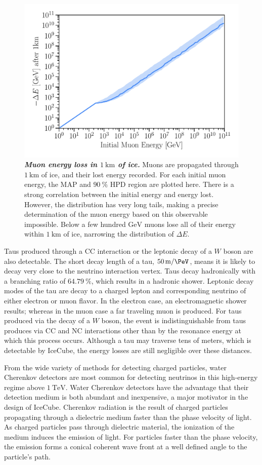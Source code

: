 \begin{figure}
	\centering
	\includegraphics[width=0.8\linewidth]{figures/muon_energy}
	\internallinenumbers
	\caption{\textbf{\textit{Muon energy loss in $\SI{1}\km$ of ice.}}
	Muons are propagated through $\SI{1}\km$ of ice, and their lost energy recorded.
	For each initial muon energy, the MAP and $\SI{90}\percent$ HPD region are plotted here.
	There is a strong correlation between the initial energy and energy lost.
	However, the distribution has very long tails, making a precise determination of the muon energy based on this observable impossible.
	Below a few hundred $\si\GeV$ muons lose all of their energy within $\SI{1}\km$ of ice, narrowing the distribution of $\Delta E$.
	}\label{fig:muon_energy}
\end{figure}

Taus produced through a CC interaction or the leptonic decay of a $W$ boson are also detectable.
The short decay length of a tau, $\SI{50}\meter / \si\PeV$, means it is likely to decay very close to the neutrino interaction vertex.
Taus decay hadronically with a branching ratio of $\SI{64.79}\percent$, which results in a hadronic shower.
Leptonic decay modes of the tau are decay to a charged lepton and corresponding neutrino of either electron or muon flavor.
In the electron case, an electromagnetic shower results; whereas in the muon case a far traveling muon is produced.
For taus produced via the decay of a $W$ boson, the event is indistinguishable from taus produces via CC and NC interactions other than by the resonance energy at which this process occurs.
Although a tau may traverse tens of meters, which is detectable by IceCube, the energy losses are still negligible over these distances.

From the wide variety of methods for detecting charged particles, water Cherenkov detectors are most common for detecting neutrinos in this high-energy regime above $\SI{1}\TeV$.
Water Cherenkov detectors have the advantage that their detection medium is both abundant and inexpensive, a major motivator in the design of IceCube.
Cherenkov radiation is the result of charged particles propagating through a dielectric medium faster than the phase velocity of light.
As charged particles pass through dielectric material, the ionization of the medium induces the emission of light.
For particles faster than the phase velocity, the emission forms a conical coherent wave front at a well defined angle to the particle's path.

